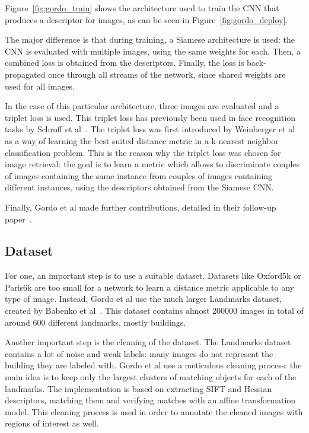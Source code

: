 Figure~\ref{fig:gordo_train} shows the architecture used to train the CNN
that produces a descriptor for images, as can be seen in
Figure~\ref{fig:gordo_deploy}.

The major difference is that during training, a Siamese architecture is
used: the CNN is evaluated with multiple images, using the same weights
for each. Then, a combined loss is obtained from the descriptors.
Finally, the loss is back-propagated once through all streams of the network,
since shared weights are used for all images.

In the case of this particular architecture, three images are evaluated
and a triplet loss is used. This triplet loss has previously been used
in face recognition tasks by Schroff et al~\cite{schroff_facenet:_2015}.
The triplet loss was first introduced by
Weinberger et al~\cite{weinberger_distance_2006} as a way of learning
the best suited distance metric in a k-nearest neighbor classification
problem.
This is the reason why the triplet loss was chosen for image retrieval:
the goal is to learn a metric which allows to discriminate couples of
images containing the same instance from couples of images containing
different instances, using the descriptors obtained from the Siamese
CNN.

Finally, Gordo et al made further contributions, detailed in their
follow-up paper~\cite{gordo_end--end_2016}.
\subsection{Dataset}
For one, an important step is to use a suitable dataset. Datasets like
Oxford5k or Paris6k are too small for a network to learn a distance metric
applicable to any type of image. Instead, Gordo et al use the much larger
Landmarks dataset, created by Babenko et al~\cite{babenko_neural_2014}.
This dataset contains almost 200000 images in total of around 600
different landmarks, mostly buildings.

Another important step is the cleaning of the dataset. The Landmarks
dataset contains a lot of noise and weak labels: many images do not
represent the building they are labeled with. Gordo et al use a meticulous
cleaning process: the main idea is to keep only the largest clusters
of matching objects for each of the landmarks. The implementation is
based on extracting SIFT and Hessian descriptors,
matching them and verifying matches with an affine transformation model.
This cleaning process is used in order to annotate the cleaned images
with regions of interest as well.

